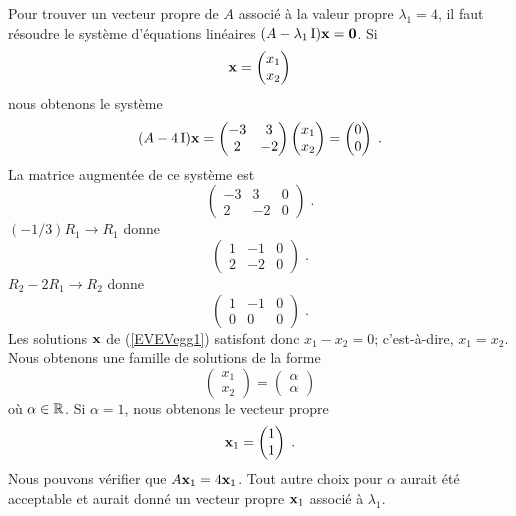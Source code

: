 {\begin{egg}
Pour trouver un vecteur propre de $A$ associé à la valeur propre
$\lambda_1=4$, il faut résoudre le système d'équations linéaires
$(A-\lambda_1 \operatorname{I}) \mathbf{x} = \mathbf{0}$.  Si
\[
\mathbf{x} =
\begin{pmatrix}
x_1 \\ x_2
\end{pmatrix}
\]
nous obtenons le système
\begin{equation}\label{EVEVegg1}
(A - 4 \operatorname{I})\mathbf{x} =
\begin{pmatrix}
-3 & 3 \\ 2 & -2  
\end{pmatrix}
\begin{pmatrix}
x_1 \\ x_2
\end{pmatrix}
=
\begin{pmatrix}
0 \\ 0
\end{pmatrix}\; .
\end{equation}
La matrice augmentée de ce système est
\[
\left(\begin{array}{rr|r}
-3 & 3 & 0 \\
2 & -2 & 0
\end{array}\right) \; .
\]
$(-1/3) R_1 \to R_1$ donne
\[
\left(\begin{array}{rr|r}
1 & -1 & 0 \\
2 & -2 & 0
\end{array}\right) \; .
\]
$R_2 - 2 R_1 \to R_2$ donne
\[
\left(\begin{array}{rr|r}
1 & -1 & 0 \\
0 & 0 & 0
\end{array}\right) \; .
\]
Les solutions $\mathbf{x}$ de (\ref{EVEVegg1}) satisfont donc
$x_1 - x_2 = 0$; c'est-à-dire, $x_1=x_2$.  Nous obtenons une famille de
solutions de la forme
\[
\begin{pmatrix}
x_1 \\ x_2
\end{pmatrix}
=
\begin{pmatrix}
\alpha \\ \alpha
\end{pmatrix}
\]
où $\alpha \in \mathbb{R}$.  Si $\alpha = 1$, nous obtenons le vecteur propre
\[
\mathbf{x}_1 =
\begin{pmatrix}
1 \\ 1
\end{pmatrix} \; .
\]
Nous pouvons vérifier que $A\mathbf{x}_1 = 4 \mathbf{x}_1$.  Tout autre
choix pour $\alpha$ aurait été acceptable et aurait donné un vecteur
propre $\mathbf{x}_1$ associé à $\lambda_1$.


\end{egg}}

